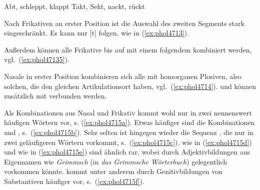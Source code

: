 \begin{exe}
  \ex\label{ex:phol4712}
  \begin{xlist}
  	\ex Abt, schleppt, klappt
  	\ex Takt, Sekt, nackt, rückt
  \end{xlist}
\end{exe}

Nach Frikativen an erster Position ist die Auswahl des zweiten Segments stark eingeschränkt.
Es kann nur [t] folgen, wie in (\ref{ex:phol4713}).

\begin{exe}
\end{exe}

Außerdem können alle Frikative bis auf \textipa{[s]} mit einem folgendem \textipa{[s]} kombiniert werden, vgl.\ (\ref{ex:phol47135}).

\begin{exe}
\end{exe}

Nasale in erster Position kombinieren sich alle mit homorganen Plosiven, also solchen, die den gleichen Artikulationsort haben, vgl.\ (\ref{ex:phol4714}).
\textipa{[m]} und \textipa{[N]} können zusätzlich mit \textipa{[t]} verbunden werden.

\begin{exe}
  \ex\label{ex:phol4714}
  \begin{xlist}
  \end{xlist}
\end{exe}

Als Kombinationen aus Nasal und Frikativ kommt \textipa{[n\c{c}]} wohl nur in zwei nennenswert häufigen Wörtern vor, s. (\ref{ex:phol4715a}).
Etwas häufiger sind die Kombinationen \textipa{[nf]} und \textipa{[ns]}, s.\ (\ref{ex:phol4715b}).
Sehr selten ist hingegen wieder die Sequenz \textipa{[nS]}, die nur in zwei geläufigeren Wörtern vorkommt, s.\ (\ref{ex:phol4715c}).
\textipa{[ms]} wie in (\ref{ex:phol4715d}) und \textipa{[mS]} wie in (\ref{ex:phol4715e}) sind ähnlich rar, wobei \textipa{[mS]} durch Adjektivbildungen aus Eigennamen wie \textit{Grimmsch} (in \textit{das Grimmsche Wörterbuch}) gelegentlich vorkommen könnte.
\textipa{[Ns]} kommt unter anderem durch Genitivbildungen von Substantiven häufiger vor, s.\ (\ref{ex:phol4715f}).

\begin{exe}
  \ex\label{ex:phol4715}
  \begin{xlist}
  \end{xlist}
\end{exe}

